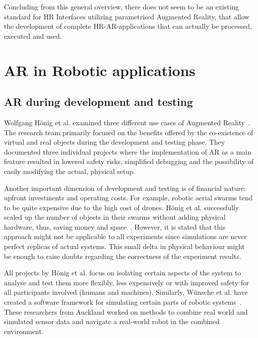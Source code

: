 Concluding from this general overview, there does not seem to be an existing standard for HR Interfaces utilizing parametrised Augmented Reality, that allow the development of complete HR-AR-applications that can actually be processed, executed and used. 



\section{AR in Robotic applications}
\subsection{AR during development and testing}
Wolfgang Hönig et al. examined three different use cases of Augmented Reality~\cite{hoenig2015mixed}. The research team primarily focused on the benefits offered by the co-existence of virtual and real objects during the development and testing phase. They documented three individual projects where the implementation of AR as a main feature resulted in lowered safety risks, simplified debugging and the possibility of easily modifying the actual, physical setup.

Another important dimension of development and testing is of financial nature: upfront investments and operating costs. For example, robotic aerial swarms tend to be quite expensive due to the high cost of drones. Hönig et al. successfully scaled up the number of objects in their swarms without adding physical hardware, thus, saving money and space~\cite{hoenig2015mixed}. However, it is stated that this approach might not be applicable to all experiments since simulations are never perfect replicas of actual systems. This small delta in physical behaviour might be enough to raise doubts regarding the correctness of the experiment results.

All projects by Hönig et al. focus on isolating certain aspects of the system to analyse and test them
more flexibly, less expensively or with improved safety for all participants involved (humans and
machines). Similarly, Wünsche et al. have created a software framework for simulating certain parts
of robotic systems~\cite{chen2009mixed}. These researchers from Auckland worked on methods to combine real world
and simulated sensor data and navigate a real-world robot in the combined environment.

